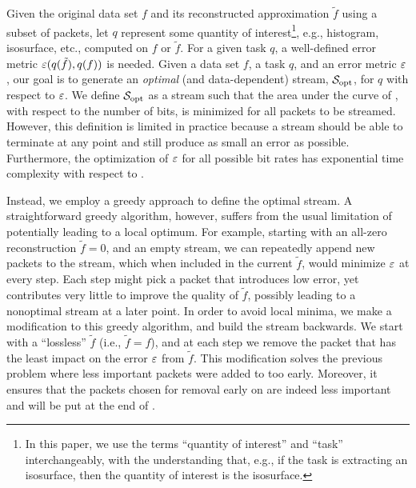 Given the original data set $f$ and its reconstructed approximation $\tilde{f}$ using a subset of
packets, let $q$ represent some quantity of interest\footnote{In this paper, we use the terms
``quantity of interest'' and ``task'' interchangeably, with the understanding that, e.g., if the
task is extracting an isosurface, then the quantity of interest is the isosurface.}, e.g., histogram,
isosurface, etc., computed on $f$ or $\tilde{f}$. For a given task $q$, a well-defined error metric
$\err(q(\tilde{f}),q(f))$ is needed. Given a data set $f$, a task $q$, and an error metric $\err$,
our goal is to generate an \emph{optimal} (and data-dependent) stream, $\sopt$, for $q$ with respect
to $\err$. We define $\sopt$ as a stream such that the area under the curve of \err, 
with respect to the number of bits, is minimized
for all packets to be streamed. However, this definition is limited in practice because a stream
should be able to terminate at any point and still produce as small an error as possible. Furthermore,
the optimization of $\err$ for all possible bit rates has exponential time complexity with 
respect to .

Instead, we employ a greedy approach to define the optimal stream.  A straightforward greedy
algorithm, however, suffers from the usual limitation of potentially leading to a local optimum. For
example, starting with an all-zero reconstruction $\tilde{f}=0$, and an empty stream, we can
repeatedly append new packets to the stream, which when included in the current $\tilde{f}$, would
minimize $\err$ at every step. Each step might pick a packet that introduces low error, yet
contributes very little to improve the quality of $\tilde{f}$, possibly leading to a nonoptimal
stream at a later point. In order to avoid local minima, we make a modification to this greedy
algorithm, and build the stream backwards. We start with a ``lossless'' $\tilde{f}$ (i.e.,
$\tilde{f}=f$), and at each step we remove the packet that has the least impact on the error $\err$
from $\tilde{f}$. This modification solves the previous problem where less important packets were
added to \sopt too early. Moreover, it ensures that the packets chosen for removal early on are
indeed less important and will be put at the end of \sopt.

